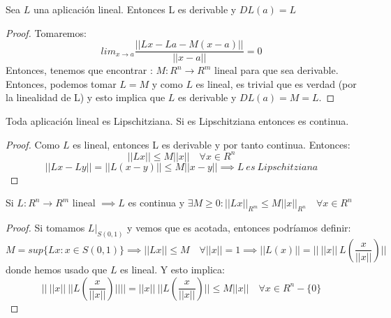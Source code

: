 \begin{nprop}
	Sea $L$ una aplicación lineal. Entonces L es derivable y $DL(a) = L$

\end{nprop}
\begin{proof}

	Tomaremos:
	\[
	lim_{x\to a} \frac{||Lx -La - M(x-a)||}{||x-a||}= 0
	\]
	Entonces, tenemos que encontrar : $M: R^n \to R^m$ lineal para que sea derivable. Entonces, podemos tomar $L=M$ y como $L$ es lineal, es trivial que es verdad (por la linealidad de L) y esto implica que $L$ es derivable y $DL(a) = M = L$.
\end{proof}

\begin{nprop}
	Toda aplicación lineal es Lipschitziana. Si es Lipschitziana entonces es continua.
\end{nprop}
\begin{proof}
	Como $L$ es lineal, entonces L es derivable y por tanto continua. Entonces:
	\[
	||Lx|| \leq M||x|| \quad \forall x \in R^n
	\]
	\[
	 ||Lx-Ly|| = ||L(x-y) || \leq M||x-y|| \implies L\ es \ Lipschitziana
	\]
\end{proof}


\begin{nprop}
	Si $L:R^n \to R^m$ lineal $\implies L $ es continua y $\exists M \geq 0: ||Lx||_{R^m} \leq M ||x||_{R^n} \quad \forall x \in R^n$
\end{nprop}
\begin{proof}
	Si tomamos $L|_{S(0,1)}$ y vemos que es acotada, entonces podríamos definir: \[M = sup\{Lx : x \in S(0,1)\} \implies ||Lx|| \leq M \quad \forall ||x|| = 1 \implies ||L(x)|| = ||\ ||x||\ L(\frac{x}{||x||}) ||\] donde hemos usado que $L$ es lineal. Y esto implica: \[||\ ||x||\ || L(\frac{x}{||x||})|| || = ||x||\ || L(\frac{x}{||x||}) || \leq M||x|| \quad \forall x \in R^n-\{0\}\]
\end{proof}


